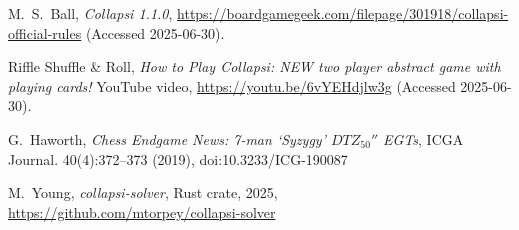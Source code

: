 \documentclass[a4paper, twocolumn]{article}
\begin{document}
\begin{thebibliography}{9}

  M.~S.~Ball,
  \textit{Collapsi 1.1.0},
  \url{https://boardgamegeek.com/filepage/301918/collapsi-official-rules}
  (Accessed 2025-06-30).

  Riffle Shuffle \& Roll,
  \textit{How to Play Collapsi: NEW two player abstract game with playing cards!}
  YouTube video,
  \url{https://youtu.be/6vYEHdjlw3g}
  (Accessed 2025-06-30).

  G.~Haworth,
  \textit{Chess Endgame News: 7-man `Syzygy' $DTZ_{50}''$ EGTs},
  ICGA Journal. 40(4):372--373 (2019),
  doi:10.3233/ICG-190087

  M.~Young,
  \textit{collapsi-solver},
  Rust crate,
  2025,
  \url{https://github.com/mtorpey/collapsi-solver}

\end{thebibliography}
\end{document}
